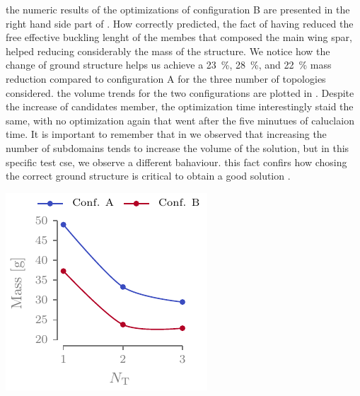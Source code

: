the numeric results of the optimizations of configuration B are presented in the right hand side part of . How correctly predicted, the fact of having reduced the free effective buckling lenght of the membes that composed the main wing spar, helped reducing considerably the mass of the structure. We notice how the change of ground structure helps us achieve a \qty{23}{\percent}, \qty{28}{\percent}, and \qty{22}{\percent} mass reduction compared to configuration A for the three number of topologies considered. the volume trends for the two configurations are plotted in . Despite the increase of candidates member, the optimization time interestingly staid the same, with no optimization again that went after the five minutues of caluclaion time. It is important to remember that in  we observed that increasing the number of subdomains tends to increase the volume of the solution, but in this specific test cse, we observe a different bahaviour. this fact confirs how chosing the correct ground structure is critical to obtain a good solution .

\begin{marginfigure}
    \centering
    \includegraphics[width=\linewidth]{figures/07_aeronautic/00_NACA_vol_crv/vol.pdf}
    \caption{}
    \label{fig:07_mass_b}
\end{marginfigure}

